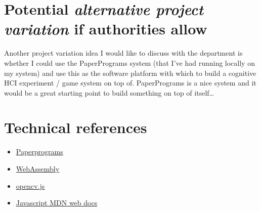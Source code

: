 \documentclass[11pt]{article}
\begin{document}
\section*{Potential \textbf{\emph{alternative project variation}} if authorities allow}
\label{sec:org7ed096e}

Another project variation idea I would like to discuss with the department is whether I could use the PaperPrograms system (that I've had running locally on my system) and use this as the software platform with which to build a cognitive HCI experiment / game system on top of. PaperPrograms is a nice system and it would be a great starting point to build something on top of itself\ldots{}\\

\section*{Technical references}
\label{sec:orgbc3bcaa}
\begin{itemize}
\item \href{https://paperprograms.org/}{Paperprograms}
\label{sec:org70801f8}
\item \href{https://webassembly.org/}{WebAssembly}
\label{sec:org5f530bb}
\item \href{https://docs.opencv.org/3.4/d5/d10/tutorial\_js\_root.html}{opencv.js}
\label{sec:org461e4ef}
\item \href{https://developer.mozilla.org/en-US/docs/Web/javascript}{Javascript MDN web docs}
\label{sec:orge87b91f}
\end{itemize}
\section*{}
\label{sec:orgcbefec8}
\\
\\
\end{document}
